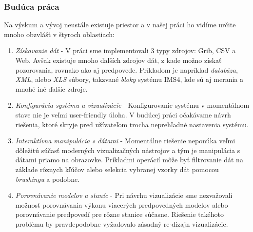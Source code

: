\subsubsection{Budúca práca}

Na výskum a vývoj neustále existuje priestor a v našej práci ho vidíme určite mnoho obzvlášť v štyroch oblastiach:
\begin{enumerate}
	\item \textit{Získavanie dát} - V práci sme implementovali 3 typy zdrojov: Grib, CSV a Web. Avšak existuje mnoho ďalších zdrojov dát, z kade možno získať pozorovania, rovnako ako aj predpovede. Príkladom je napríklad \textit{databáza}, \textit{XML}, alebo \textit{XLS} súbory, takzvané \textit{bloky} systému IMS4, kde sú aj merania a mnohé iné ďalšie zdroje. 
	\item \textit{Konfigurácia systému a vizualizácie} - Konfigurovanie systému v momentálnom stave nie je veľmi user-friendly úloha. V budúcej práci očakávame návrh riešenia, ktoré skryje pred užívateľom trocha neprehľadné nastavenia systému.
	\item \textit{Interaktívna manipulácia s dátami} - Momentálne riešenie neponúka veľmi dôležitú súčasť moderných vizualizačných nástrojov a tým je manipulácia s dátami priamo na obrazovke. Príkladmi operácií môže byť filtrovanie dát na základe rôznych kľúčov alebo selekcia vybranej vzorky dát pomocou \textit{brushingu} a podobne.
	\item \textit{Porovnávanie modelov a staníc} - Pri návrhu vizualizácie sme nezvažovali možnosť porovnávania výkonu viacerých predpovedných modelov alebo porovnávanie predpovedí pre rôzne stanice súčasne. Riešenie takéhoto problému by pravdepodobne vyžadovalo zásadný re-dizajn vizualizácie.
\end{enumerate}


